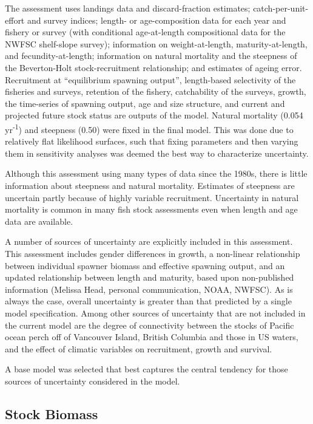 \documentclass[12pt,]{article}
\begin{document}
The assessment uses landings data and discard-fraction estimates;
catch-per-unit-effort and survey indices; length- or age-composition
data for each year and fishery or survey (with conditional age-at-length
compositional data for the NWFSC shelf-slope survey); information on
weight-at-length, maturity-at-length, and fecundity-at-length;
information on natural mortality and the steepness of the Beverton-Holt
stock-recruitment relationship; and estimates of ageing error.
Recruitment at ``equilibrium spawning output'', length-based selectivity
of the fisheries and surveys, retention of the fishery, catchability of
the surveys, growth, the time-series of spawning output, age and size
structure, and current and projected future stock status are outputs of
the model. Natural mortality (0.054 yr\textsuperscript{-1}) and
steepness (0.50) were fixed in the final model. This was done due to
relatively flat likelihood surfaces, such that fixing parameters and
then varying them in sensitivity analyses was deemed the best way to
characterize uncertainty.

Although this assessment using many types of data since the 1980s, there
is little information about steepness and natural mortality. Estimates
of steepness are uncertain partly because of highly variable
recruitment. Uncertainty in natural mortality is common in many fish
stock assessments even when length and age data are available.

A number of sources of uncertainty are explicitly included in this
assessment. This assessment includes gender differences in growth, a
non-linear relationship between individual spawner biomass and effective
spawning output, and an updated relationship between length and
maturity, based upon non-published information (Melissa Head, personal
communication, NOAA, NWFSC). As is always the case, overall uncertainty
is greater than that predicted by a single model specification. Among
other sources of uncertainty that are not included in the current model
are the degree of connectivity between the stocks of Pacific ocean perch
off of Vancouver Island, British Columbia and those in US waters, and
the effect of climatic variables on recruitment, growth and survival.

A base model was selected that best captures the central tendency for
those sources of uncertainty considered in the model.

\subsection*{Stock Biomass}\label{stock-biomass}
\end{document}
